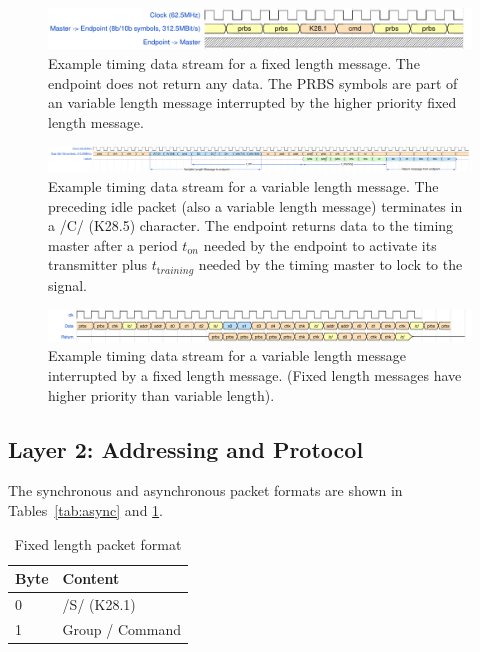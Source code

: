 \documentclass[a4paper,11pt]{article}
\begin{document}
\begin{landscape}
\begin{figure}[h]
	\centering
	\includegraphics[width=\linewidth]{dts_sp-fixed-length-message.pdf}
	\caption{Example timing data stream for a fixed length message. The endpoint does not return any data. The PRBS symbols are part of an variable length message interrupted by the higher priority fixed length message.}
	\label{fig:wave-fixed-length}
\end{figure}

\begin{figure}[h]
	\centering
	\includegraphics[width=\linewidth]{dts_sp-variable-length-message_ed.pdf}
	\caption{Example timing data stream for a variable length message. The preceding idle packet (also a variable length message) terminates in a /C/ (K28.5) character. The endpoint returns data to the timing master after a period $t_{\mathrm on}$ needed by the endpoint to activate its transmitter plus $t_{\mathrm training}$ needed by the timing master to lock to the signal.}
	\label{fig:wave-variable-length}
\end{figure}

\begin{figure}[h]
	\centering
	\includegraphics[width=\linewidth]{timing_protocol_wavedrom_01.pdf}
	\caption{Example timing data stream for a variable length message interrupted by a fixed length message. (Fixed length messages have higher priority than variable length).}
	\label{fig:wave-interupted-message}
\end{figure}
\end{landscape}


\subsection{Layer 2: Addressing and Protocol}

The synchronous and asynchronous packet formats are shown in Tables~\ref{tab:async} and \ref{tab:sync}.

\begin{table}[h!]
  \centering
  \begin{tabular}{@{}ll@{}} \toprule
    Byte & Content \\ \midrule
    0 & /S/ (K28.1) \\
    1 & Group / Command \\ \bottomrule
  \end{tabular}
  \caption{Fixed length packet format}
  \label{tab:sync}
\end{table}
\end{document}
